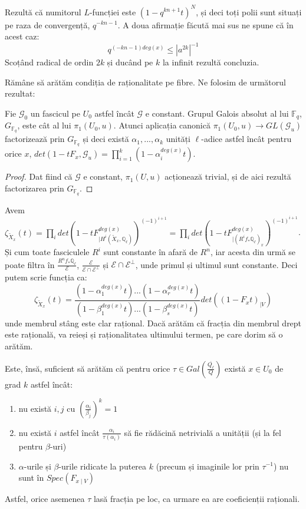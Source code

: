 \documentclass[13pt,openany]{book}
\begin{document}
Rezultă că numitorul $L$-funcției este $(1-q^{kn+1}t)^N$, și deci toți polii sunt situați pe raza de convergență, $q^{-kn-1}$. A doua afirmație făcută mai sus ne spune că în acest caz:
$$q^{(-kn-1)deg(x)}\leq|a^{2k}|^{-1}$$
Scoțând radical de ordin $2k$ și ducând pe $k$ la infinit rezultă concluzia.

Rămâne să arătăm condiția de raționalitate pe fibre. Ne folosim de următorul rezultat:

\begin{lema}
Fie $\mathcal{G}_0$ un fascicul pe $U_0$ astfel încât $\mathcal{G}$ e constant. Grupul Galois absolut al lui $\mathbb{F}_q$, $G_{\mathbb{F}_q}$, este cât al lui $\pi_1(U_0,u)$. Atunci aplicația canonică $\pi_1(U_0,u) \rightarrow GL(\mathcal{G}_u)$ factorizează prin $G_{\mathbb{F}_q}$ și deci există $\alpha_1,...,\alpha_k$ unități $\ell$-adice astfel încât pentru orice $x$, $det(1-tF_x, \mathcal{G}_u)=\prod_{i=1}^k (1-\alpha_i^{deg(x)}t)$.
\end{lema}

\begin{proof}
Dat fiind că $\mathcal{G}$ e constant, $\pi_1(U,u)$ acționează trivial, și de aici rezultă factorizarea prin $G_{\mathbb{F}_q}$.
\end{proof}

Avem $\zeta_{\widetilde{X}_x}(t)=\prod_i det(1-tF^{deg(x)}_{\mid H^i(\widetilde{X}_x,\mathbb{Q}_\ell)})^{(-1)^{i+1}}=\prod_i det(1-tF^{deg(x)}_{\mid (R^i f_* \mathbb{Q}_\ell)_x})^{(-1)^{i+1}}$. Și cum toate fasciculele $R^i$ sunt constante în afară de $R^n$, iar acesta din urmă se poate filtra în $\frac{R^n f_* \mathbb{Q}_\ell}{\mathcal{E}}$, $\frac{\mathcal{E}}{\mathcal{E} \cap \mathcal{E}^\perp}$ și $\mathcal{E} \cap \mathcal{E}^\perp$, unde primul și ultimul sunt constante. Deci putem scrie funcția ca:
$$\zeta_{\widetilde{X}_x}(t)=\frac{(1-\alpha_1^{deg(x)}t)...(1-\alpha_r^{deg(x)}t)}{(1-\beta_1^{deg(x)}t)...(1-\beta_s^{deg(x)}t)}det((1-F_xt)_{\mid V})$$
unde membrul stâng este clar rațional. Dacă arătăm că fracția din membrul drept este rațională, va reieși și raționalitatea ultimului termen, pe care dorim să o arătăm.

Este, însă, suficient să arătăm că pentru orice $\tau \in Gal(\frac{\overline{Q_\ell}}{Q})$ există $x \in U_0$ de grad $k$ astfel încât:
\begin{enumerate}
\item nu există $i,j$ cu $(\frac{\alpha_i}{\beta_j})^k=1$
\item nu există $i$ astfel încât $\frac{\alpha_i}{\tau(\alpha_i)}$ să fie rădăcină netrivială a unității (și la fel pentru $\beta$-uri)
\item $\alpha$-urile și $\beta$-urile ridicate la puterea $k$ (precum și imaginile lor prin $\tau^{-1}$) nu sunt în $Spec(F_{x\mid V})$
\end{enumerate}
Astfel, orice asemenea $\tau$ lasă fracția pe loc, ca urmare ea are coeficienții raționali.
\end{document}

